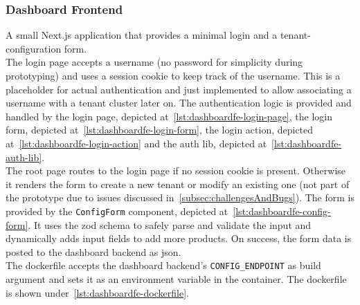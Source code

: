 \documentclass[11pt, a4paper, oneside, listof=totoc]{scrartcl}
\begin{document}
            \subsubsection{Dashboard Frontend}\label{subsubsec:dashboardFrontend}
                A small Next.js application that provides a minimal login and a tenant-configuration
                form.\\
                The login page accepts a username (no password for simplicity during prototyping)
                and uses a session cookie to keep track of the username.
                This is a placeholder for actual authentication and just implemented to allow
                associating a username with a tenant cluster later on.
                The authentication logic is provided and handled by the login page, depicted
                at~\autoref{lst:dashboardfe-login-page}, the login form, depicted
                at~\autoref{lst:dashboardfe-login-form}, the login action, depicted
                at~\autoref{lst:dashboardfe-login-action} and the auth lib, depicted
                at~\autoref{lst:dashboardfe-auth-lib}.\\
                The root page routes to the login page if no session cookie is present.
                Otherwise it renders the form to create a new tenant or modify an existing one
                (not part of the prototype due to issues discussed
                in~\autoref{subsec:challengesAndBugs}).
                The form is provided by the \texttt{ConfigForm} component, depicted
                at~\autoref{lst:dashboardfe-config-form}.
                It uses the zod schema to safely parse and validate the input and dynamically
                adds input fields to add more products.
                On success, the form data is posted to the dashboard backend as \gls{json}.\\
                The dockerfile accepts the dashboard backend's \texttt{CONFIG\_ENDPOINT} as build
                argument and sets it as an environment variable in the container.
                The dockerfile is shown under~\autoref{lst:dashboardfe-dockerfile}.
\end{document}
